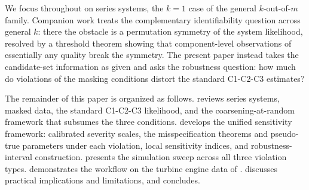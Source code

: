 We focus throughout on series systems, the $k = 1$ case of the general
$k$-out-of-$m$ family. Companion work \citep{towell2026binary} treats the
complementary identifiability question across general $k$: there the
obstacle is a permutation symmetry of the system likelihood, resolved by a
threshold theorem showing that component-level observations of essentially
any quality break the symmetry. The present paper instead takes the
candidate-set information as given and asks the robustness question: how
much do violations of the masking conditions distort the standard
C1-C2-C3 estimates?

The remainder of this paper is organized as follows.
 reviews series systems, masked data, the standard
C1-C2-C3 likelihood, and the coarsening-at-random framework that subsumes
the three conditions.  develops the unified sensitivity
framework: calibrated severity scales, the misspecification theorems and
pseudo-true parameters under each violation, local sensitivity indices,
and robustness-interval construction.  presents
the simulation sweep across all three violation types.
 demonstrates the workflow on the turbine engine data
of \citet{Huairu-2013}.  discusses practical
implications and limitations, and  concludes.

